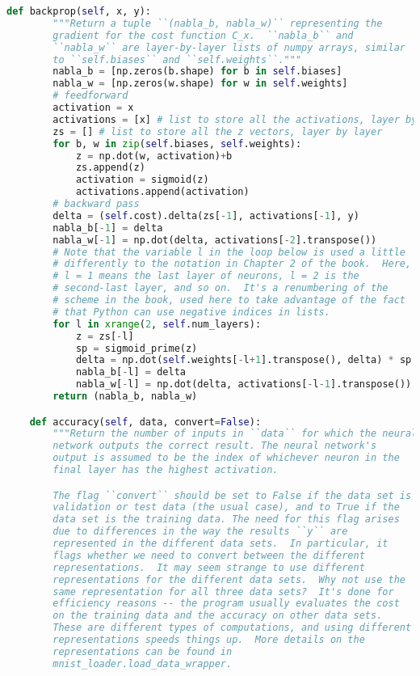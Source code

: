 \begin{lstlisting}[language=Python]
    def backprop(self, x, y):
        """Return a tuple ``(nabla_b, nabla_w)`` representing the
        gradient for the cost function C_x.  ``nabla_b`` and
        ``nabla_w`` are layer-by-layer lists of numpy arrays, similar
        to ``self.biases`` and ``self.weights``."""
        nabla_b = [np.zeros(b.shape) for b in self.biases]
        nabla_w = [np.zeros(w.shape) for w in self.weights]
        # feedforward
        activation = x
        activations = [x] # list to store all the activations, layer by layer
        zs = [] # list to store all the z vectors, layer by layer
        for b, w in zip(self.biases, self.weights):
            z = np.dot(w, activation)+b
            zs.append(z)
            activation = sigmoid(z)
            activations.append(activation)
        # backward pass
        delta = (self.cost).delta(zs[-1], activations[-1], y)
        nabla_b[-1] = delta
        nabla_w[-1] = np.dot(delta, activations[-2].transpose())
        # Note that the variable l in the loop below is used a little
        # differently to the notation in Chapter 2 of the book.  Here,
        # l = 1 means the last layer of neurons, l = 2 is the
        # second-last layer, and so on.  It's a renumbering of the
        # scheme in the book, used here to take advantage of the fact
        # that Python can use negative indices in lists.
        for l in xrange(2, self.num_layers):
            z = zs[-l]
            sp = sigmoid_prime(z)
            delta = np.dot(self.weights[-l+1].transpose(), delta) * sp
            nabla_b[-l] = delta
            nabla_w[-l] = np.dot(delta, activations[-l-1].transpose())
        return (nabla_b, nabla_w)

    def accuracy(self, data, convert=False):
        """Return the number of inputs in ``data`` for which the neural
        network outputs the correct result. The neural network's
        output is assumed to be the index of whichever neuron in the
        final layer has the highest activation.

        The flag ``convert`` should be set to False if the data set is
        validation or test data (the usual case), and to True if the
        data set is the training data. The need for this flag arises
        due to differences in the way the results ``y`` are
        represented in the different data sets.  In particular, it
        flags whether we need to convert between the different
        representations.  It may seem strange to use different
        representations for the different data sets.  Why not use the
        same representation for all three data sets?  It's done for
        efficiency reasons -- the program usually evaluates the cost
        on the training data and the accuracy on other data sets.
        These are different types of computations, and using different
        representations speeds things up.  More details on the
        representations can be found in
        mnist_loader.load_data_wrapper.


\end{lstlisting}
